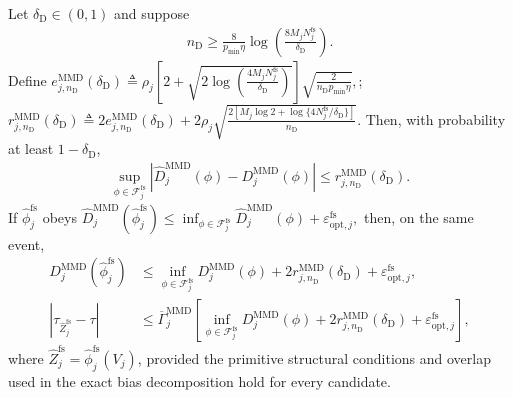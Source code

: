 \begin{proposition}
\label{prop:finite-strata-mmd-learning-bound}
Let $\delta_{\mathrm D}\in(0,1)$ and suppose
\begin{align}
n_{\mathrm D}
\ge
\frac{8}{p_{\min}\eta}
\log\left(\frac{8M_jN_j^{\mathrm{fs}}}{\delta_{\mathrm D}}\right).
\label{eq:finite-mmd-sample-threshold}
\end{align}
Define
\(e_{j,n_{\mathrm D}}^{\mathrm{MMD}}(\delta_{\mathrm D}) \triangleq \rho_j \left[ 2+\sqrt{2\log\left(\frac{4M_jN_j^{\mathrm{fs}}}{\delta_{\mathrm D}}\right)} \right] \sqrt{\frac{2}{n_{\mathrm D}p_{\min}\eta}},\); \(r_{j,n_{\mathrm D}}^{\mathrm{MMD}}(\delta_{\mathrm D}) \triangleq 2e_{j,n_{\mathrm D}}^{\mathrm{MMD}}(\delta_{\mathrm D}) +2\rho_j \sqrt{ \frac{ 2\left[M_j\log2+\log\{4N_j^{\mathrm{fs}}/\delta_{\mathrm D}\}\right] }{n_{\mathrm D}} }.\)
Then, with probability at least $1-\delta_{\mathrm D}$,
\begin{align}
\sup_{\phi\in\mathcal F_j^{\mathrm{fs}}}
\left|
\widehat D_j^{\mathrm{MMD}}(\phi)-D_j^{\mathrm{MMD}}(\phi)
\right|
\le
r_{j,n_{\mathrm D}}^{\mathrm{MMD}}(\delta_{\mathrm D}).
\label{eq:finite-mmd-uniform-deviation}
\end{align}
If $\widehat\phi_j^{\mathrm{fs}}$ obeys
\(\widehat D_j^{\mathrm{MMD}}(\widehat\phi_j^{\mathrm{fs}}) \le \inf_{\phi\in\mathcal F_j^{\mathrm{fs}}} \widehat D_j^{\mathrm{MMD}}(\phi) +\varepsilon_{\mathrm{opt},j}^{\mathrm{fs}},\)
then, on the same event,
\begin{align}
D_j^{\mathrm{MMD}}(\widehat\phi_j^{\mathrm{fs}})
&\le
\inf_{\phi\in\mathcal F_j^{\mathrm{fs}}}
D_j^{\mathrm{MMD}}(\phi)
+2r_{j,n_{\mathrm D}}^{\mathrm{MMD}}(\delta_{\mathrm D})
+\varepsilon_{\mathrm{opt},j}^{\mathrm{fs}},
\label{eq:finite-mmd-oracle}\\
|\tau_{\widehat Z_j^{\mathrm{fs}}}-\tau|
&\le
\overline\Gamma_j^{\mathrm{MMD}}
\left[
\inf_{\phi\in\mathcal F_j^{\mathrm{fs}}}
D_j^{\mathrm{MMD}}(\phi)
+2r_{j,n_{\mathrm D}}^{\mathrm{MMD}}(\delta_{\mathrm D})
+\varepsilon_{\mathrm{opt},j}^{\mathrm{fs}}
\right],
\label{eq:finite-mmd-causal-oracle}
\end{align}
where $\widehat Z_j^{\mathrm{fs}}=\widehat\phi_j^{\mathrm{fs}}(V_j)$, provided the primitive structural conditions and overlap used in the exact bias decomposition hold for every candidate.
\end{proposition}

